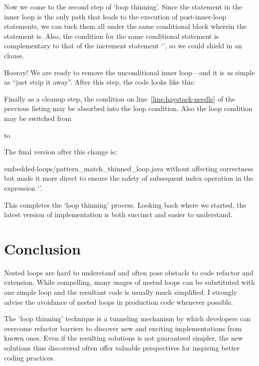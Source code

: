 Now we come to the second step of `loop thinning'.
Since the  statement in the inner loop is the only path that leads to the
execution of post-inner-loop statements, we can tuck them all under the same
conditional block wherein the  statement is.
Also, the condition for the same conditional statement is complementary to that of the
increment statement `', so we could shield  in an  clause.


Hooray!
We are ready to remove the unconditional inner loop---and it is as simple as ``just strip it away''.
After this step, the code looks like this:

Finally as a cleanup step, the condition on line~\ref{line:haystack-needle} of the previous listing
may be absorbed into the loop condition.
Also the loop condition may be switched from
\begin{quote}
\end{quote}
to
\begin{quote}
\end{quote}
The final version after this change is:

{embedded-loops/pattern_match_thinned_loop.java}
without affecting correctness but made it more direct to ensure the safety of subsequent index
operation in the expression `'.

This completes the `loop thinning' process.
Looking back where we started, the latest version of implementation is both succinct and easier to
understand.


\section{Conclusion}\label{sec:loop-push-up-conclusion}



Nested loops are hard to understand and often pose obstacle to code refactor and extension.
While compelling, many usages of nested loops can be
substituted with one simple loop and the resultant code is usually much simplified.
I strongly advise the avoidance of nested loops in production code whenever possible.


The `loop thinning' technique is a tunneling mechanism by which developers can overcome
refactor barriers to discover new and exciting implementations from known ones.
Even if the resulting solutions is not guaranteed simpler, the new solutions thus discovered often
offer valuable perspectives for inspiring better coding practices.
